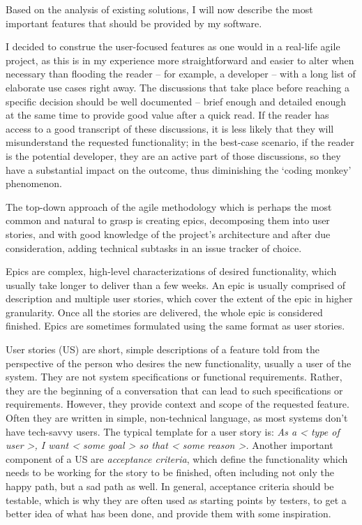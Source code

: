 \linebreak
Based on the analysis of existing solutions, I will now describe the most important features that should be provided by my software.

I decided to construe the user-focused features as one would in a real-life agile project,
as this is in my experience more straightforward and easier to alter when necessary than flooding the reader -- for example, a developer -- with a long list of elaborate use cases right away.
The discussions that take place before reaching a specific decision should be well documented -- brief enough and detailed enough at the same time to provide good value after a quick read.
If the reader has access to a good transcript of these discussions, it is less likely that they will misunderstand the requested functionality;
in the best-case scenario, if the reader is the potential developer, they are an active part of those discussions, so they have a substantial impact on the outcome, thus diminishing the `coding monkey' phenomenon.

The top-down approach of the agile methodology which is perhaps the most common and natural to grasp is creating epics, decomposing them into user stories,
and with good knowledge of the project's architecture and after due consideration, adding technical subtasks in an issue tracker of choice.

Epics are complex, high-level characterizations of desired functionality, which usually take longer to deliver than a few weeks.
An epic is usually comprised of description and multiple user stories, which cover the extent of the epic in higher granularity.
Once all the stories are delivered, the whole epic is considered finished.
Epics are sometimes formulated using the same format as user stories.

User stories (US) are short, simple descriptions of a feature told from the perspective of the person who desires the new functionality, usually a user of the system.\cite{user-story-definition}
They are not system specifications or functional requirements.
Rather, they are the beginning of a conversation that can lead to such specifications or requirements.
However, they provide context and scope of the requested feature.
Often they are written in simple, non-technical language, as most systems don't have tech-savvy users.
The typical template for a user story is:
\textit{As a < type of user >, I want < some goal > so that < some reason >.}\cite{user-story-definition}
Another important component of a US are \textit{acceptance criteria}, which define the functionality which needs to be working for the story to be finished, often including not only the happy path, but a sad path as well.
In general, acceptance criteria should be testable, which is why they are often used as starting points by testers, to get a better idea of what has been done, and provide them with some inspiration.

